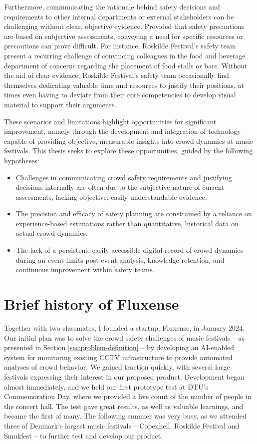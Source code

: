 Furthermore, communicating the rationale behind safety decisions and requirements to other internal departments or external stakeholders can be challenging without clear, objective evidence. Provided that safety precautions are based on subjective assessments, conveying a need for specific resources or precautions can prove difficult. For instance, Roskilde Festival's safety team present a recurring challenge of convincing colleagues in the food and beverage department of concerns regarding the placement of food stalls or bars. Without the aid of clear evidence, Roskilde Festival's safety team occasionally find themselves dedicating valuable time and resources to justify their positions, at times even having to deviate from their core competencies to develop visual material to support their arguments.

These scenarios and limitations highlight opportunities for significant improvement, namely through the development and integration of technology capable of providing objective, measurable insights into crowd dynamics at music festivals. This thesis seeks to explore these opportunities, guided by the following hypotheses:

\begin{itemize}
  \item Challenges in communicating crowd safety requirements and justifying decisions internally are often due to the subjective nature of current assessments, lacking objective, easily understandable evidence.

  \item The precision and efficacy of safety planning are constrained by a reliance on experience-based estimations rather than quantitative, historical data on actual crowd dynamics.

  \item The lack of a persistent, easily accessible digital record of crowd dynamics during an event limits post-event analysis, knowledge retention, and continuous improvement within safety teams.
\end{itemize}

\section{Brief history of Fluxense}
\label{sec:fluxense}

Together with two classmates, I founded a startup, Fluxense, in January 2024. Our initial plan was to solve the crowd safety challenges of music festivals -- as presented in Section \ref{sec:problem-definition} -- by developing an AI-enabled system for monitoring existing CCTV infrastructure to provide automated analyses of crowd behavior. We gained traction quickly, with several large festivals expressing their interest in our proposed product. Development began almost immediately, and we held our first prototype test at DTU's Commemoration Day, where we provided a live count of the number of people in the concert hall. The test gave great results, as well as valuable learnings, and became the first of many. The following summer was very busy, as we attended three of Denmark's largest music festivals -- Copenhell, Roskilde Festival and Smukfest -- to further test and develop our product.

